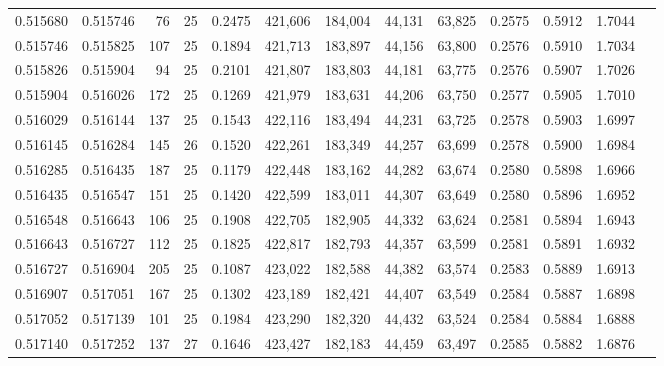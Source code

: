 \begin{tabular}{rrrrrrrrrrrrr}
0.515680 & 0.515746 &    76 &  25 &                                     0.2475 & 421,606 & 184,004 &  44,131 &  63,825 & 0.2575 & 0.5912 & 1.7044 \\
0.515746 & 0.515825 &   107 &  25 &                                     0.1894 & 421,713 & 183,897 &  44,156 &  63,800 & 0.2576 & 0.5910 & 1.7034 \\
0.515826 & 0.515904 &    94 &  25 &                                     0.2101 & 421,807 & 183,803 &  44,181 &  63,775 & 0.2576 & 0.5907 & 1.7026 \\
0.515904 & 0.516026 &   172 &  25 &                                     0.1269 & 421,979 & 183,631 &  44,206 &  63,750 & 0.2577 & 0.5905 & 1.7010 \\
0.516029 & 0.516144 &   137 &  25 &                                     0.1543 & 422,116 & 183,494 &  44,231 &  63,725 & 0.2578 & 0.5903 & 1.6997 \\
0.516145 & 0.516284 &   145 &  26 &                                     0.1520 & 422,261 & 183,349 &  44,257 &  63,699 & 0.2578 & 0.5900 & 1.6984 \\
0.516285 & 0.516435 &   187 &  25 &                                     0.1179 & 422,448 & 183,162 &  44,282 &  63,674 & 0.2580 & 0.5898 & 1.6966 \\
0.516435 & 0.516547 &   151 &  25 &                                     0.1420 & 422,599 & 183,011 &  44,307 &  63,649 & 0.2580 & 0.5896 & 1.6952 \\
0.516548 & 0.516643 &   106 &  25 &                                     0.1908 & 422,705 & 182,905 &  44,332 &  63,624 & 0.2581 & 0.5894 & 1.6943 \\
0.516643 & 0.516727 &   112 &  25 &                                     0.1825 & 422,817 & 182,793 &  44,357 &  63,599 & 0.2581 & 0.5891 & 1.6932 \\
0.516727 & 0.516904 &   205 &  25 &                                     0.1087 & 423,022 & 182,588 &  44,382 &  63,574 & 0.2583 & 0.5889 & 1.6913 \\
0.516907 & 0.517051 &   167 &  25 &                                     0.1302 & 423,189 & 182,421 &  44,407 &  63,549 & 0.2584 & 0.5887 & 1.6898 \\
0.517052 & 0.517139 &   101 &  25 &                                     0.1984 & 423,290 & 182,320 &  44,432 &  63,524 & 0.2584 & 0.5884 & 1.6888 \\
0.517140 & 0.517252 &   137 &  27 &                                     0.1646 & 423,427 & 182,183 &  44,459 &  63,497 & 0.2585 & 0.5882 & 1.6876 \\

\end{tabular}
